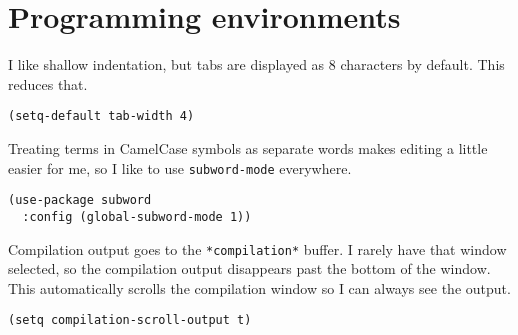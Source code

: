 \documentclass{article}
\begin{document}
\section{Programming environments}
\label{sec:orge415aef}

I like shallow indentation, but tabs are displayed as 8 characters by default.
This reduces that.

\begin{verbatim}
(setq-default tab-width 4)
\end{verbatim}

Treating terms in CamelCase symbols as separate words makes editing a little
easier for me, so I like to use \texttt{subword-mode} everywhere.

\begin{verbatim}
(use-package subword
  :config (global-subword-mode 1))
\end{verbatim}

Compilation output goes to the \texttt{*compilation*} buffer. I rarely have that window
selected, so the compilation output disappears past the bottom of the window.
This automatically scrolls the compilation window so I can always see the
output.

\begin{verbatim}
(setq compilation-scroll-output t)
\end{verbatim}
\end{document}
